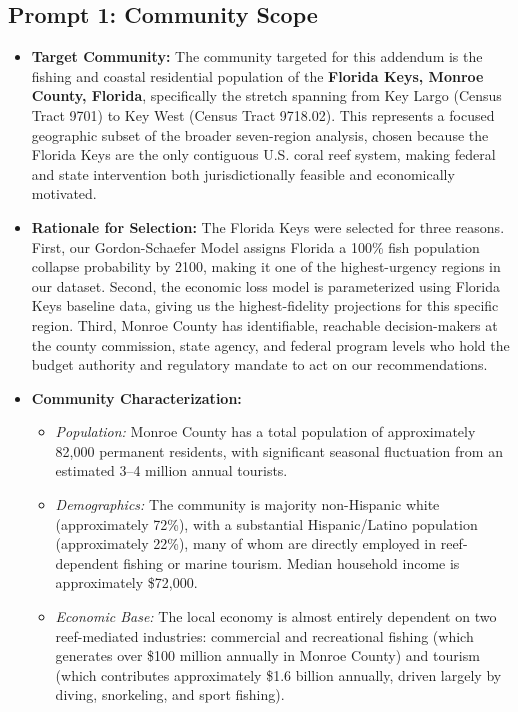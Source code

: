 \documentclass[10pt,letterpaper]{article}
\begin{document}
\subsection*{Prompt 1: Community Scope}
\begin{itemize}
    \item \textbf{Target Community:} The community targeted for this addendum is the fishing and coastal residential population of the \textbf{Florida Keys, Monroe County, Florida}, specifically the stretch spanning from Key Largo (Census Tract 9701) to Key West (Census Tract 9718.02). This represents a focused geographic subset of the broader seven-region analysis, chosen because the Florida Keys are the only contiguous U.S. coral reef system, making federal and state intervention both jurisdictionally feasible and economically motivated.
    \item \textbf{Rationale for Selection:} The Florida Keys were selected for three reasons. First, our Gordon-Schaefer Model assigns Florida a 100\% fish population collapse probability by 2100, making it one of the highest-urgency regions in our dataset. Second, the economic loss model is parameterized using Florida Keys baseline data, giving us the highest-fidelity projections for this specific region. Third, Monroe County has identifiable, reachable decision-makers at the county commission, state agency, and federal program levels who hold the budget authority and regulatory mandate to act on our recommendations.
    \item \textbf{Community Characterization:}
    \begin{itemize}
        \item \textit{Population:} Monroe County has a total population of approximately 82,000 permanent residents, with significant seasonal fluctuation from an estimated 3--4 million annual tourists.
        \item \textit{Demographics:} The community is majority non-Hispanic white (approximately 72\%), with a substantial Hispanic/Latino population (approximately 22\%), many of whom are directly employed in reef-dependent fishing or marine tourism. Median household income is approximately \$72,000.
        \item \textit{Economic Base:} The local economy is almost entirely dependent on two reef-mediated industries: commercial and recreational fishing (which generates over \$100 million annually in Monroe County) and tourism (which contributes approximately \$1.6 billion annually, driven largely by diving, snorkeling, and sport fishing).

\end{itemize}
\end{itemize}
\end{document}
